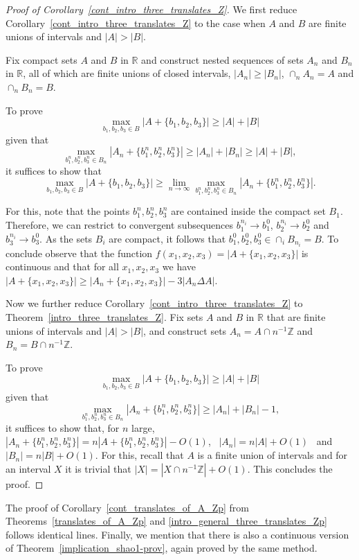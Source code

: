 \documentclass[12pt,reqno]{amsart}
\theoremstyle{definition}
\renewcommand\geq{\geqslant}
\renewcommand\ge{\geqslant}
\begin{document}
\begin{proof}[Proof of Corollary~\ref{cont_intro_three_translates_Z}]
We first reduce Corollary~\ref{cont_intro_three_translates_Z} to the case when $A$ and $B$ are finite unions of intervals and $|A|>|B|$.


Fix compact sets $A$ and $B$ in $\mathbb{R}$ and construct nested sequences of sets $A_n$ and $B_n$ in $\mathbb{R}$, all of which are finite unions of closed intervals, $|A_n| \ge |B_n|$, $\cap_n A_n = A$ and $\cap_n B_n = B$.

To prove
$$\max_{b_1,b_2,b_3\in B}|A+\{b_1,b_2,b_3\}|\geq |A|+|B|$$
given that
$$\max_{b_1^n,b_2^n,b_3^n \in B_n} |A_n+\{b_1^n,b_2^n,b_3^n\}| \geq |A_n|+|B_n| \geq |A|+|B|,$$
it suffices to show that
$$\max_{b_1,b_2,b_3 \in B} |A+\{b_1,b_2,b_3\}|\geq \lim_{n \rightarrow \infty} \max_{b_1^n,b_2^n,b_3^n \in B_n} |A_n+\{b_1^n,b_2^n,b_3^n\}|.$$

For this, note that the points $b_1^n,b_2^n,b_3^n$ are contained inside the compact set $B_1$. Therefore, we can restrict to convergent subsequences $b_1^{n_i} \rightarrow b_1^0$, $b_2^{n_i} \rightarrow b_2^0$ and $b_3^{n_i} \rightarrow b_3^0$. As the sets $B_i$ are compact, it follows that $b_1^0,b_2^0,b_3^0 \in \cap_i B_{n_i}=B$. To conclude observe that the function $f(x_1,x_2,x_3)=|A+\{x_1,x_2,x_3\}|$ is continuous and that for all $x_1,x_2,x_3$ we have $|A+\{x_1,x_2,x_3\}|\geq |A_n+\{x_1,x_2,x_3\}|-3|A_n \Delta A|$.

\vspace{5pt}
Now we further reduce Corollary~\ref{cont_intro_three_translates_Z} to Theorem~\ref{intro_three_translates_Z}.
Fix sets $A$ and $B$ in $\mathbb{R}$ that are finite unions of intervals and $|A|>|B|$, and construct sets $A_n=A\cap n^{-1}\mathbb{Z}$ and $B_n=B\cap n^{-1}\mathbb{Z}$.

To prove
\[
\max_{b_1,b_2,b_3\in B}|A+\{b_1,b_2,b_3\}|\geq |A|+|B|
\]
given that
\[
\max_{b_1^n,b_2^n,b_3^n \in B_n} |A_n+\{b_1^n,b_2^n,b_3^n\}| \geq |A_n|+|B_n|-1,
\]
it suffices to show that, for $n$ large, $|A_n+\{b_1^n,b_2^n,b_3^n\}| =n|A+\{b_1^n,b_2^n,b_3^n\}|-O(1)$, \
$|A_n|=n|A|+O(1)$ \ and \ $|B_n|=n|B|+O(1)$.
For this, recall that $A$ is a finite union of intervals and for an interval  $X$ it is trivial that $|X|=|X\cap n^{-1}\mathbb{Z}| +O(1)$. This concludes the proof.
\end{proof}

The proof of Corollary~\ref{cont_translates_of_A_Zp} from Theorems~\ref{translates_of_A_Zp} and \ref{intro_general_three_translates_Zp}
follows identical lines. Finally, we mention that there
is also a continuous version of Theorem~\ref{implication_shao1-prov}, again proved by the same method.
\end{document}
